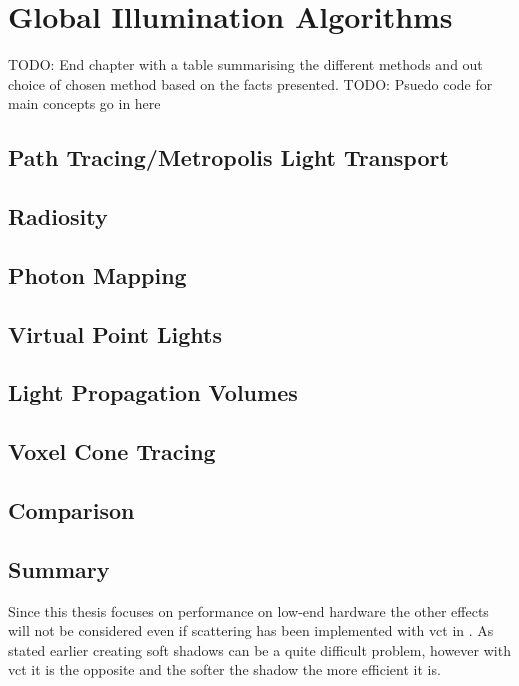 \chapter{Global Illumination Algorithms}\label{cha:related}

TODO: End chapter with a table summarising the different methods and out choice of chosen method based on the facts presented.
TODO: Psuedo code for main concepts go in here

\section{Path Tracing/Metropolis Light Transport}

\section{Radiosity}

\section{Photon Mapping}

\section{Virtual Point Lights}

\section{Light Propagation Volumes}

\section{Voxel Cone Tracing}

\section{Comparison}

\section{Summary}

Since this thesis focuses on performance on low-end hardware the other effects will not be considered even if scattering has been implemented with \gls{vct} in \cite{cedecpres}. As stated earlier creating soft shadows can be a quite difficult problem, however with \gls{vct} it is the opposite and the softer the shadow the more efficient it is.
